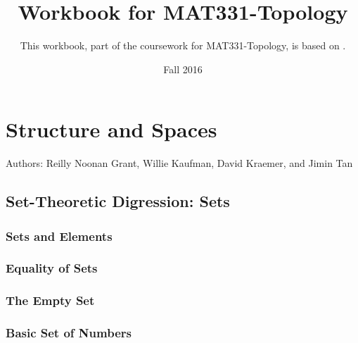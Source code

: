 \documentclass{book}
\title{Workbook for MAT331-Topology}
\date{Fall 2016}
\author{This workbook, part of the coursework for MAT331-Topology, is based on \cite{viro}.}
\begin{document}


\chapter{Structure and Spaces}
Authors: Reilly Noonan Grant, Willie Kaufman, David Kraemer, and Jimin Tan
\section{Set-Theoretic Digression: Sets}
\subsection{Sets and Elements}%
\subsection{Equality of Sets}%
\subsection{The Empty Set}%
\subsection{Basic Set of Numbers}%

















\end{document}
